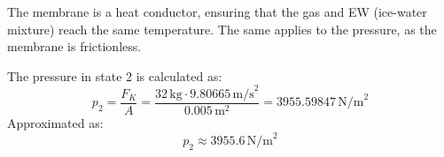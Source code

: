 The membrane is a heat conductor, ensuring that the gas and EW (ice-water mixture) reach the same temperature. The same applies to the pressure, as the membrane is frictionless.  

The pressure in state 2 is calculated as:  
\[
p_2 = \frac{F_K}{A} = \frac{32 \, \text{kg} \cdot 9.80665 \, \text{m/s}^2}{0.005 \, \text{m}^2} = 3955.59847 \, \text{N/m}^2
\]  
Approximated as:  
\[
p_2 \approx 3955.6 \, \text{N/m}^2
\]